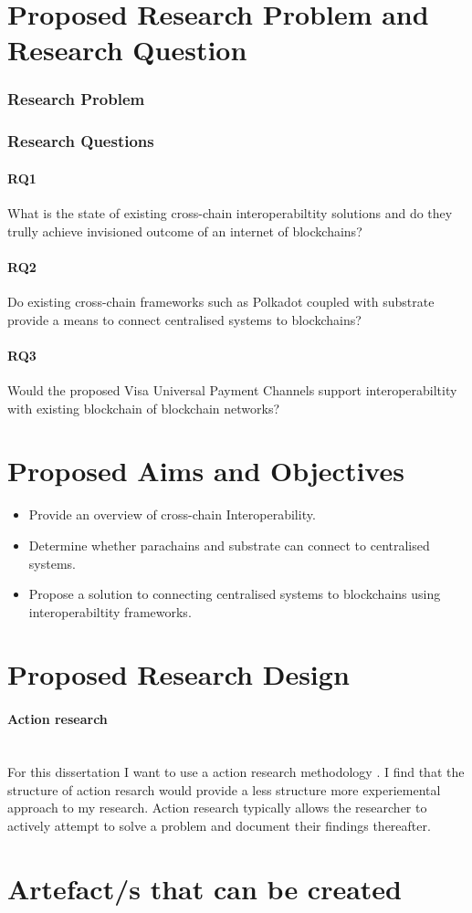 \documentclass[12pt]{article}
\begin{document}
\section{Proposed Research Problem and Research Question}
\subsubsection{Research Problem}

\subsubsection{Research Questions}
\paragraph{RQ1} What is the state of existing cross-chain interoperabiltity solutions and do they trully achieve invisioned outcome of an internet of blockchains? 
\paragraph{RQ2} Do existing cross-chain frameworks such as Polkadot coupled with substrate provide a means to connect centralised systems to blockchains? 
\paragraph{RQ3} Would the proposed Visa Universal Payment Channels support interoperabiltity with existing blockchain of blockchain networks?

\section{Proposed Aims and Objectives}
\begin{itemize}
    \item Provide an overview of cross-chain Interoperability.
    \item Determine whether parachains and substrate can connect to centralised systems.
    \item Propose a solution to connecting centralised systems to blockchains using interoperabiltity frameworks.
\end{itemize}

\section{Proposed Research Design}
\paragraph{Action research}\mbox{} \\
For this dissertation I want to use a action research methodology \autocite{10.5555/2842927}. I find that the structure of action resarch would provide a 
less structure more experiemental approach to my research. Action research typically allows the researcher to actively attempt to solve a problem and document their findings thereafter.
\section{Artefact/s that can be created}

\printbibliography
\end{document}
